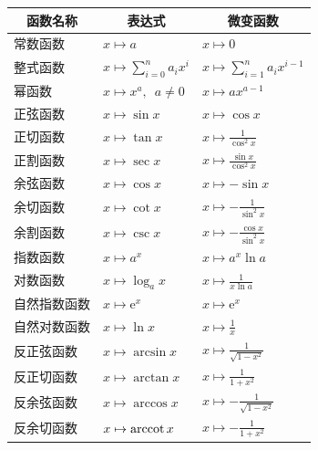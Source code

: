 \documentclass[12pt,UTF8,fontset=none]{ctexbook}
\begin{document}
\begin{appendix}
\begin{center}
    \renewcommand{\arraystretch}{2}
    \setlength{\extrarowheight}{-3pt}
    \begin{longtable}{|l|l|l|}
        \hline \multicolumn{1}{|c|}{\textbf{函数名称}} & \multicolumn{1}{c|}{\textbf{表达式}} & \multicolumn{1}{c|}{\textbf{微变函数}} \\ 
        \hline         
        常数函数 & $x\mapsto a$ & $x\mapsto 0$ \\  
        \hline
        整式函数 & $x\mapsto \sum_{i=0}^n a_i x^i$ & $x\mapsto \sum_{i=1}^n a_i x^{i-1}$ \\ 
        \hline
        幂函数 & $x\mapsto x^a, \,\,\, a\neq 0$ & $x\mapsto ax^{a-1}$ \\ 
        \hline
        正弦函数 & $x\mapsto \sin{x}$ & $x\mapsto \cos{x}$ \\ 
        \hline
        正切函数 & $x\mapsto \tan{x}$ & $x\mapsto \frac{1}{\cos^2{x}}$ \\
        \hline
        正割函数 & $x\mapsto \sec{x}$ & $x\mapsto \frac{\sin{x}}{\cos^2{x}}$ \\ 
        \hline
        余弦函数 & $x\mapsto \cos{x}$ & $x\mapsto -\sin{x}$ \\ 
        \hline
        余切函数 & $x\mapsto \cot{x}$ & $x\mapsto -\frac{1}{\sin^2{x}}$ \\ 
        \hline
        余割函数 & $x\mapsto \csc{x}$ & $x\mapsto -\frac{\cos{x}}{\sin^2{x}}$ \\
        \hline
        指数函数 & $x\mapsto a^x$ & $x\mapsto a^x \ln{a} $ \\ 
        \hline
        对数函数 & $x\mapsto \log_a{x}$ & $x\mapsto \frac{1}{x\ln{a}} $ \\
        \hline
        自然指数函数 & $x\mapsto \mathrm{e}^x$ & $x\mapsto \mathrm{e}^x $ \\ 
        \hline
        自然对数函数 & $x\mapsto \ln{x}$ & $x\mapsto \frac{1}{x} $ \\  
        \hline
        反正弦函数 & $x\mapsto \arcsin{x}$ & $x\mapsto \frac{1}{\sqrt{1 - x^2}}$ \\ 
        \hline
        反正切函数 & $x\mapsto \arctan{x}$ & $x\mapsto \frac{1}{1 + x^2}$ \\
        \hline
        反余弦函数 & $x\mapsto \arccos{x}$ & $x\mapsto -\frac{1}{\sqrt{1 - x^2}}$ \\ 
        \hline
        反余切函数 & $x\mapsto \operatorname{arccot}{x}$ & $x\mapsto -\frac{1}{1 + x^2}$ \\ 
        \hline
    \end{longtable}
\end{center}


\end{appendix}
\end{document}
